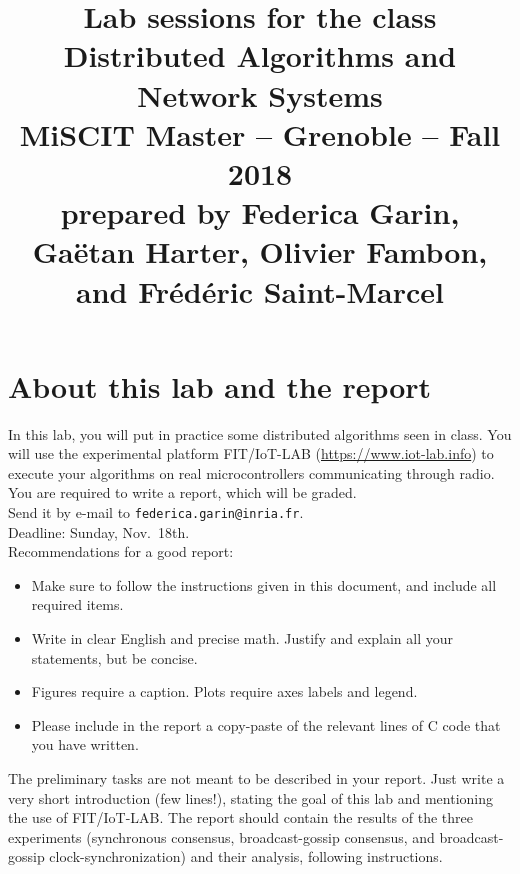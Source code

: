 \documentclass[oneside]{article}
\begin{document}
\title{
{\normalsize Lab sessions for the class}\\[-1mm]
Distributed Algorithms and Network Systems\\[-1mm]
{\normalsize MiSCIT Master -- Grenoble -- Fall 2018}\\[-1mm]
{\normalsize prepared by Federica Garin, Ga\"{e}tan Harter,  Olivier Fambon, and Fr\'ed\'eric Saint-Marcel}}
\date{}
\maketitle



\section{About this lab and the report}
In this lab, you will put in practice some distributed algorithms seen in class.
You will use the experimental platform FIT/IoT-LAB (\url{https://www.iot-lab.info})
to execute your algorithms on real microcontrollers communicating through radio.\\

You are required to write a report, which will be graded.\\ Send it by e-mail to \texttt{federica.garin@inria.fr}.\\
Deadline: Sunday, Nov.~18th.\\

Recommendations for a good report:
\begin{itemize}
\item Make sure to follow the instructions given in this document, and include all required items.
\item Write in clear English and precise math. Justify and explain all your statements, but be concise.
\item Figures require a caption. Plots require axes labels and legend.
\item Please include in the report a copy-paste of the relevant lines of C code that you have written.
\end{itemize}

The preliminary tasks are not meant to be described in your report. Just write a very short introduction (few lines!), stating the goal of this lab and mentioning the use of FIT/IoT-LAB.
The report should contain the results of the three experiments (synchronous consensus, broadcast-gossip consensus, and broadcast-gossip clock-synchronization) and their analysis, following instructions.
\end{document}
